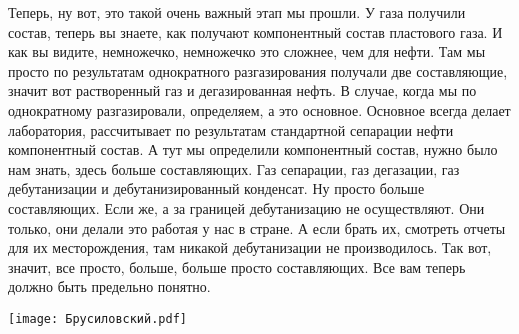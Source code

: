 \documentclass[main.tex]{subfiles}
\begin{document}
Теперь, ну вот, это такой очень важный этап мы прошли.
У газа получили состав, теперь вы знаете, как получают компонентный состав пластового газа.
И как вы видите, немножечко, немножечко это сложнее, чем для нефти.
Там мы просто по результатам однократного разгазирования получали две составляющие, значит вот растворенный газ и дегазированная нефть.
В случае, когда мы по однократному разгазировали, определяем, а это основное.
Основное всегда делает лаборатория, рассчитывает по результатам стандартной сепарации нефти компонентный состав.
А тут мы определили компонентный состав, нужно было нам знать, здесь больше составляющих.
Газ сепарации, газ дегазации, газ дебутанизации и дебутанизированный конденсат.
Ну просто больше составляющих.
Если же, а за границей дебутанизацию не осуществляют.
Они только, они делали это работая у нас в стране.
А если брать их, смотреть отчеты для их месторождения, там никакой дебутанизации не производилось.
Так вот, значит, все просто, больше, больше просто составляющих.
Все вам теперь должно быть предельно понятно.

\begin{center}
\texttt{[image: Брусиловский.pdf]}
\end{center}
\end{document}
